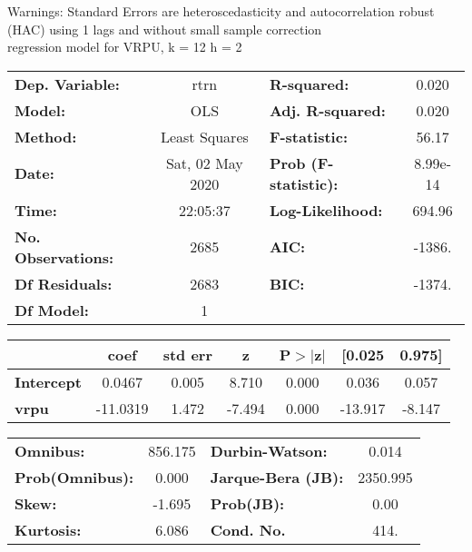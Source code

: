 Warnings: \newline
 [1] Standard Errors are heteroscedasticity and autocorrelation robust (HAC) using 1 lags and without small sample correction\\ 

regression model for VRPU, k = 12 h = 2\begin{center}
\begin{tabular}{lclc}
\toprule
\textbf{Dep. Variable:}    &       rtrn       & \textbf{  R-squared:         } &     0.020   \\
\textbf{Model:}            &       OLS        & \textbf{  Adj. R-squared:    } &     0.020   \\
\textbf{Method:}           &  Least Squares   & \textbf{  F-statistic:       } &     56.17   \\
\textbf{Date:}             & Sat, 02 May 2020 & \textbf{  Prob (F-statistic):} &  8.99e-14   \\
\textbf{Time:}             &     22:05:37     & \textbf{  Log-Likelihood:    } &    694.96   \\
\textbf{No. Observations:} &        2685      & \textbf{  AIC:               } &    -1386.   \\
\textbf{Df Residuals:}     &        2683      & \textbf{  BIC:               } &    -1374.   \\
\textbf{Df Model:}         &           1      & \textbf{                     } &             \\
\bottomrule
\end{tabular}
\begin{tabular}{lcccccc}
                   & \textbf{coef} & \textbf{std err} & \textbf{z} & \textbf{P$> |$z$|$} & \textbf{[0.025} & \textbf{0.975]}  \\
\midrule
\textbf{Intercept} &       0.0467  &        0.005     &     8.710  &         0.000        &        0.036    &        0.057     \\
\textbf{vrpu}      &     -11.0319  &        1.472     &    -7.494  &         0.000        &      -13.917    &       -8.147     \\
\bottomrule
\end{tabular}
\begin{tabular}{lclc}
\textbf{Omnibus:}       & 856.175 & \textbf{  Durbin-Watson:     } &    0.014  \\
\textbf{Prob(Omnibus):} &   0.000 & \textbf{  Jarque-Bera (JB):  } & 2350.995  \\
\textbf{Skew:}          &  -1.695 & \textbf{  Prob(JB):          } &     0.00  \\
\textbf{Kurtosis:}      &   6.086 & \textbf{  Cond. No.          } &     414.  \\
\bottomrule
\end{tabular}
\end{center}

